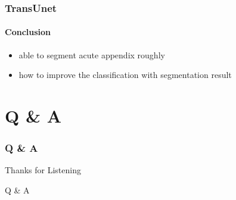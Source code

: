 \documentclass[
	11pt, %
	aspectratio=169, %
]{beamer}
\begin{document}
\begin{frame}
	\frametitle{TransUnet}
	\framesubtitle{Conclusion}

	\begin{itemize}
		\item able to segment acute appendix roughly
		\item how to improve the classification with segmentation result
	\end{itemize}
\end{frame}






\section{Q \& A}

\begin{frame}
    \frametitle{Q \& A}
	\begin{center}
		{\Huge Thanks for Listening}
		
		\bigskip\bigskip %
		
		{\LARGE Q \& A}

	\end{center}
\end{frame}

\end{document}
